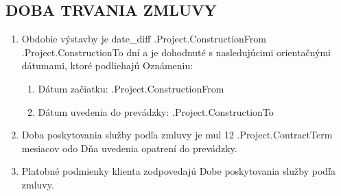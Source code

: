\subsection{DOBA TRVANIA ZMLUVY }
\begin{enumerate}
	\item Obdobie výstavby je {{date_diff .Project.ConstructionFrom .Project.ConstructionTo}} dní a je dohodnuté s nasledujúcimi orientačnými dátumami, ktoré podliehajú Oznámeniu:
	\begin{enumerate}
		\item	Dátum začiatku:    \iffalse input project.construction_from value="{{.Project.ConstructionFrom}}" type="date" \fi {{.Project.ConstructionFrom}}
		\item	Dátum uvedenia do prevádzky:	   \iffalse input project.construction_to value="{{.Project.ConstructionTo}}" type="date" \fi {{.Project.ConstructionTo}}
	\end{enumerate}

	\item Doba poskytovania služby podľa zmluvy je {{mul 12 .Project.ContractTerm}} mesiacov odo Dňa uvedenia opatrení do prevádzky.
	\item	Platobné podmienky klienta zodpovedajú Dobe poskytovania služby podľa zmluvy.
\end{enumerate}

